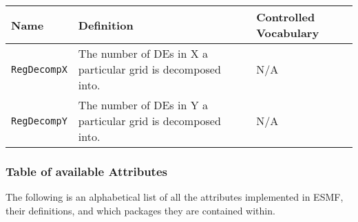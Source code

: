 \begin{longtable}{|p{5cm}|p{5cm}|p{35mm}|}
\hline\hline
{\bf Name} & {\bf Definition} & {\bf Controlled Vocabulary} \\
\hline\hline
{\tt RegDecompX} & The number of DEs in X a particular grid is decomposed into.& N/A\\
{\tt RegDecompY} & The number of DEs in Y a particular grid is decomposed into.& N/A\\
\hline\hline
\end{longtable}

\vspace{.20in}

\subsubsection{Table of available Attributes}

The following is an alphabetical list of all the attributes implemented in ESMF, their definitions, and which packages they are contained within.

\noindent

